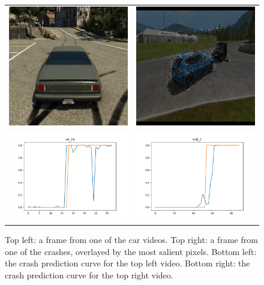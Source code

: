 \documentclass[letterpaper, twocolumn]{article} %
\begin{document}
\begin{figure}
\begin{tabular}{c c}
\includegraphics[width=0.5\columnwidth]{figures/v4_19_0.png} &
\includegraphics[width=0.5\columnwidth]{figures/v18_2_42.png}  \\
\includegraphics[width=0.5\columnwidth]{figures/v4_19_plot.png} &
\includegraphics[width=0.5\columnwidth]{figures/v18_2_plot.png} 
\end{tabular}
\caption{Top left: a frame from one of the car videos. Top right: a frame from one of the crashes, overlayed by the most salient pixels. Bottom left: the crash prediction curve for the top left video. Bottom right: the crash prediction curve for the top right video.}
\end{figure}
\end{document}
